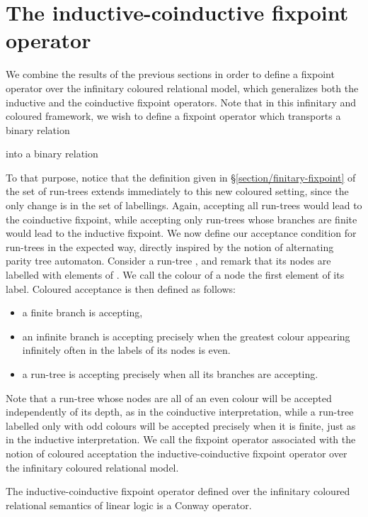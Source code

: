 \documentclass[runningheads,a4paper]{llncs}
\begin{document}
\section{The inductive-coinductive fixpoint operator~}
\label{section/y-colore}
We combine the results of the previous sections
in order to define a fixpoint operator  over the infinitary coloured relational model, 
which generalizes both the inductive and the coinductive fixpoint operators.
Note that in this infinitary and coloured framework,
we wish to define a fixpoint operator  which transports a binary relation

into a binary relation

To that purpose, notice that the definition given in \S\ref{section/finitary-fixpoint}
of the set  of run-trees
extends immediately to this new coloured setting, since the only change is in the set of labellings. 
Again, accepting all run-trees would lead to the coinductive fixpoint, while accepting only run-trees whose branches are finite 
would lead to the inductive fixpoint. 
We now define our acceptance condition for run-trees in the expected way, 
directly inspired by the notion of alternating parity tree automaton.
Consider a run-tree , and remark that its nodes are labelled with elements 
of . 
We call the colour of a node the first element of its label. Coloured acceptance is then defined as follows:
\begin{itemize}
\item a finite branch is accepting,
\item an infinite branch is accepting precisely when the greatest colour appearing infinitely often in the labels of its nodes is even.
\item a run-tree is accepting precisely when all its branches are accepting.
\end{itemize}
Note that a run-tree whose nodes are all of an even colour will be accepted independently of its depth, 
as in the coinductive interpretation, while a run-tree labelled only with odd colours will be accepted 
precisely when it is finite, just as in the inductive interpretation. 
We call the fixpoint operator associated with the notion of coloured acceptation 
the inductive-coinductive fixpoint operator over the infinitary coloured relational model.

\begin{theorem}
The inductive-coinductive fixpoint operator  defined over the infinitary coloured relational semantics of linear logic
is a Conway operator.
\end{theorem}
\end{document}
